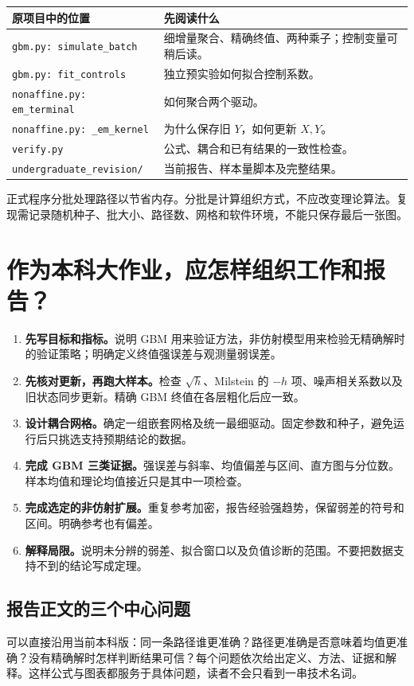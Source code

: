 \documentclass[11pt,a4paper,fontset=none]{ctexart}
\begin{document}
\begin{table}[H]\centering\small
\begin{tabularx}{\textwidth}{@{}lX@{}}\toprule
原项目中的位置 & 先阅读什么\\\midrule
\texttt{gbm.py: simulate\_batch} & 细增量聚合、精确终值、两种乘子；控制变量可稍后读。\\
\texttt{gbm.py: fit\_controls} & 独立预实验如何拟合控制系数。\\
\texttt{nonaffine.py: em\_terminal} & 如何聚合两个驱动。\\
\texttt{nonaffine.py: \_em\_kernel} & 为什么保存旧 $Y$，如何更新 $X,Y$。\\
\texttt{verify.py} & 公式、耦合和已有结果的一致性检查。\\
\texttt{undergraduate\_revision/} & 当前报告、样本量脚本及完整结果。\\\bottomrule
\end{tabularx}
\end{table}
正式程序分批处理路径以节省内存。分批是计算组织方式，不应改变理论算法。复现需记录随机种子、批大小、路径数、网格和软件环境，不能只保存最后一张图。

\newpage
\section{作为本科大作业，应怎样组织工作和报告？}
\begin{enumerate}
\item \textbf{先写目标和指标。}说明 GBM 用来验证方法，非仿射模型用来检验无精确解时的验证策略；明确定义终值强误差与观测量弱误差。
\item \textbf{先核对更新，再跑大样本。}检查 $\sqrt h$、Milstein 的 $-h$ 项、噪声相关系数以及旧状态同步更新。精确 GBM 终值在各层粗化后应一致。
\item \textbf{设计耦合网格。}确定一组嵌套网格及统一最细驱动。固定参数和种子，避免运行后只挑选支持预期结论的数据。
\item \textbf{完成 GBM 三类证据。}强误差与斜率、均值偏差与区间、直方图与分位数。样本均值和理论均值接近只是其中一项检查。
\item \textbf{完成选定的非仿射扩展。}重复参考加密，报告经验强趋势，保留弱差的符号和区间。明确参考也有偏差。
\item \textbf{解释局限。}说明未分辨的弱差、拟合窗口以及负值诊断的范围。不要把数据支持不到的结论写成定理。
\end{enumerate}

\subsection*{报告正文的三个中心问题}
可以直接沿用当前本科版：同一条路径谁更准确？路径更准确是否意味着均值更准确？没有精确解时怎样判断结果可信？每个问题依次给出定义、方法、证据和解释。这样公式与图表都服务于具体问题，读者不会只看到一串技术名词。
\end{document}
